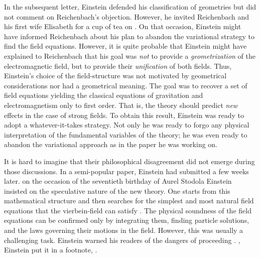 \documentclass[draft]{article}
\newcommand{\vbein}{vierbein\xspace}
\begin{document}
In the subsequent letter, Einstein defended his classification of geometries but did not comment on Reichenbach's objection. However, he invited Reichenbach and his first wife Elisabeth for a cup of tea on . On that occasion, Einstein might have informed Reichenbach about his plan to abandon the variational strategy to find the field equations. However, it is quite probable that Einstein might have explained to Reichenbach that his goal was \emph{not} to provide a \emph{geometrization} of the electromagnetic field, but to provide their \emph{unification} of both fields. Thus, Einstein's choice of the field-structure was not motivated by geometrical considerations nor had a geometrical meaning. The goal was to recover a set of field equations yielding the classical equations of gravitation and electromagnetism only to first order. That is, the theory should predict \emph{new} effects in the case of strong fields. To obtain this result, Einstein was ready to adopt a whatever-it-takes strategy. Not only he was ready to forgo any physical interpretation of the fundamental variables of the theory; he was even ready to abandon the variational approach as in the paper he was working on. 

It is hard to imagine that their philosophical disagreement did not emerge during those discussions. In a semi-popular paper, Einstein had submitted a few weeks later.  on the occasion of the seventieth birthday of Aurel Stodola\label{stodola} Einstein insisted on the speculative nature of the new theory. One starts from this mathematical structure and then searches for the simplest and most natural field equations that the \vbein-field can satisfy \citep[131]{Einstein1929}. The physical soundness of the field equations can be confirmed only by integrating them, finding particle solutions, and the laws governing their motions in the field. However, this was usually a challenging task. Einstein warned his readers of the dangers of proceeding  \citep[127]{Einstein1929}. , Einstein put it in a footnote,  \citep[127]{Einstein1929}.


\end{document}
